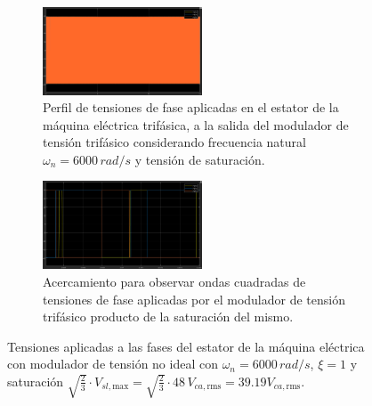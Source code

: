 \documentclass{article}
\begin{document}
\begin{figure}[H]
    \centering
    \begin{subfigure}[t]{\textwidth}
        \centering
        \includegraphics[width=0.52\textwidth]{Imagenes/Tensiones_Aplicadas_ModuladorTNL.png}
        \caption{Perfil de tensiones de fase aplicadas en el estator de la máquina eléctrica trifásica, a la salida del modulador de tensión trifásico considerando frecuencia natural \(\omega_n = 6000\, rad/s\) y tensión de saturación.}
        \label{fig:Tensiones_Aplicadas_ModuladorTNL}
    \end{subfigure}
    
    \vspace{0.5cm} %
    
    \begin{subfigure}[t]{\textwidth}
        \centering
        \includegraphics[width=0.52\textwidth]{Imagenes/Acercamiento_Tensiones_Aplicadas_ModuladorTNL.png}
        \caption{Acercamiento para observar ondas cuadradas de tensiones de fase aplicadas por el modulador de tensión trifásico producto de la saturación del mismo.}
        \label{fig:Acercamiento_Tensiones_Aplicadas_ModuladorTNL}
    \end{subfigure}
    \caption{Tensiones aplicadas a las fases del estator de la máquina eléctrica con modulador de tensión no ideal con \(\omega_n = 6000\, rad/s\), \(\xi = 1\) y saturación $\sqrt{\frac{2}{3}}\cdot V_{sl, \text{max}} = \sqrt{\frac{2}{3}}\cdot 48\, V_{ca, \text{rms}} = 39{.}19 V_{ca, \text{rms}}$.}
    \label{fig:Tensiones_Aplicadas_Moudaldor_TensionNI}
\end{figure}
\end{document}
